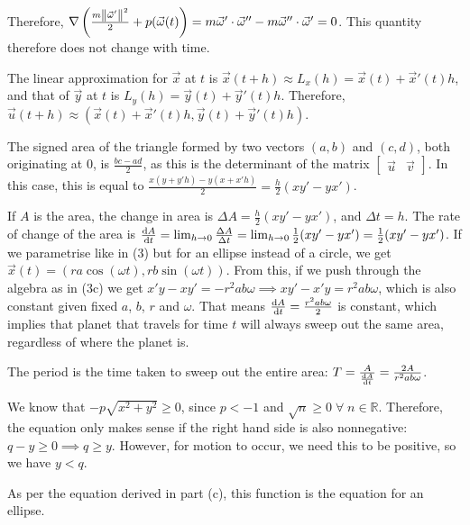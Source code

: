 Therefore, $\nabla \left(\frac{m \left\lVert\vec{\omega}'\right\rVert^2}{2} + p(\vec{\omega}(t)\right) = m\vec{\omega}' \cdot \vec{\omega}'' - m\vec{\omega}'' \cdot \vec{\omega}' = 0$. This quantity therefore does not change with time.


The linear approximation for $\vec{x}$ at $t$ is $\vec{x}(t + h) \approx L_x(h) = \vec{x}(t) + \vec{x}'(t)h$, and that of $\vec{y}$ at $t$ is $L_y(h) = \vec{y}(t) + \vec{y}'(t)h$. Therefore, $\vec{u}(t + h) \approx (\vec{x}(t) + \vec{x}'(t)h, \vec{y}(t) + \vec{y}'(t)h)$.

The signed area of the triangle formed by two vectors $(a, b)$ and $(c, d)$, both originating at $0$, is $\frac{bc - ad}{2}$, as this is the determinant of the matrix $\begin{bmatrix}\vec{u} & \vec{v}\end{bmatrix}$. In this case, this is equal to $\frac{x(y + y'h) - y(x + x'h)}{2} = \frac{h}{2}(xy' - yx')$.

If $A$ is the area, the change in area is $\Delta A = \frac{h}{2} (xy' - yx')$, and $\Delta t = h$. The rate of change of the area is $\frac{\mathop{}\!\mathrm{d} A}{\mathop{}\!\mathrm{d} t} = \lim_{h \rightarrow 0} \frac{\Delta A}{\Delta t} = \lim_{h \rightarrow 0} \frac{1}{2} (xy' - yx') = \frac{1}{2} (xy' - yx')$. If we parametrise like in (3) but for an ellipse instead of a circle, we get $\vec{x}(t) = (ra \cos(\omega t), rb \sin(\omega t))$. From this, if we push through the algebra as in (3c) we get $x'y - xy' = -r^2 a b \omega \implies xy' - x'y = r^2 a b \omega$, which is also constant given fixed $a$, $b$, $r$ and $\omega$. That means $\frac{\mathop{}\!\mathrm{d} A}{\mathop{}\!\mathrm{d} t} = \frac{r^2 a b \omega}{2}$ is constant, which implies that planet that travels for time $t$ will always sweep out the same area, regardless of where the planet is.

The period is the time taken to sweep out the entire area: $T = \frac{A}{\frac{\mathop{}\!\mathrm{d} A}{\mathop{}\!\mathrm{d} t}} = \frac{2A}{r^2 a b \omega}$.


We know that $-p\sqrt{x^2 + y^2} \geq 0$, since $p < -1$ and $\sqrt{n} \geq 0 \;\forall\; n \in \mathbb{R}$. Therefore, the equation only makes sense if the right hand side is also nonnegative: $q - y \geq 0 \implies q \geq y$. However, for motion to occur, we need this to be positive, so we have $y < q$.

As per the equation derived in part (c), this function is the equation for an ellipse.

